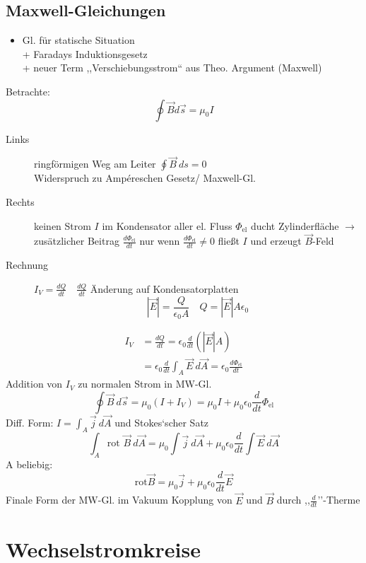 \documentclass[titlepage,12pt,a4paper,ngerman]{report}
\newcommand{\tx}[1]{\textrm{#1}}
\begin{document}
\subsection{Maxwell-Gleichungen}
\begin{itemize}
	\item Gl. für statische Situation\\
	+ Faradays Induktionsgesetz\\
	+ neuer Term ,,Verschiebungsstrom`` aus Theo. Argument (Maxwell)
\end{itemize}
Betrachte: $$\oint \vec{B}d \vec{s} = \mu_0 I$$
\begin{description}
	\item [Links] ringförmigen Weg am Leiter $\oint \vec{B}\ ds = 0$\\
	Widerspruch zu Ampéreschen Gesetz/ Maxwell-Gl.
	\item [Rechts] keinen Strom $I$ im Kondensator aller el. Fluss $\Phi_{\tx{el}}$ ducht Zylinderfläche $\rightarrow$ zusätzlicher Beitrag $\frac{d \Phi_\tx{el}}{dt}$ nur wenn $\frac{d \Phi_\tx{el}}{dt} \neq 0$ fließt $I$ und erzeugt $\vec{B}$-Feld
	\item [Rechnung] $I_V = \frac{dQ}{dt} \quad \frac{dQ}{dt}$ Änderung auf Kondensatorplatten
	$$|\vec{E}| = \frac{Q}{\epsilon_0 A} \quad Q = |\vec{E}|A\epsilon_0$$ 
\end{description}
\begin{align*}
	I_V &= \frac{dQ}{dt} = \epsilon_0 \frac{d}{dt} (|\vec{E}|A)\\
	&= \epsilon_0 \frac{d}{dt} \int_A \vec{E}\ d\vec{A} = \epsilon_0 \frac{d \Phi_{\tx{el}}}{dt}
\end{align*}
Addition von $I_V$ zu normalen Strom in MW-Gl.
$$\boxed{\oint \vec{B}\ d\vec{s} = \mu_0 (I +I_V) = \mu_0 I + \mu_0 \epsilon_0 \frac{d}{dt}\Phi_{\tx{el}}}$$
Diff. Form: $ I = \int_A \vec{j}\ d\vec{A}$ und Stokes`scher Satz
$$\int_A \tx{rot } \vec{B}\ d\vec{A} = \mu_0 \int \vec{j}\ d \vec{A} + \mu_0 \epsilon_0 \frac{d}{dt} \int \vec{E}\ d\vec{A}$$
A beliebig: $$\tx{rot} \vec{B} = \mu_0 \vec{j} + \mu_0 \epsilon_0 \frac{d}{dt}\vec{E}$$
Finale Form der MW-Gl. im Vakuum Kopplung von $\vec{E}$ und $\vec{B}$ durch ,,$\frac{d}{dt}$''-Therme

\section{Wechselstromkreise}
\end{document}
